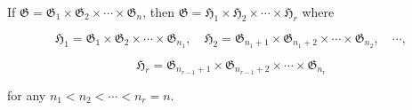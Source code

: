 If $\mathfrak{G} = \mathfrak{G}_1 \times \mathfrak{G}_2 \times \cdots \times \mathfrak{G}_n$, then $\mathfrak{G} = \mathfrak{H}_1 \times \mathfrak{H}_2 \times \cdots \times \mathfrak{H}_r$ where

$$\mathfrak{H}_1 = \mathfrak{G}_1 \times \mathfrak{G}_2 \times \cdots \times \mathfrak{G}_{n_1}, \quad \mathfrak{H}_2 = \mathfrak{G}_{n_1+1} \times \mathfrak{G}_{n_1+2} \times \cdots \times \mathfrak{G}_{n_2}, \quad \cdots,$$

$$\mathfrak{H}_r = \mathfrak{G}_{n_{r-1}+1} \times \mathfrak{G}_{n_{r-1}+2} \times \cdots \times \mathfrak{G}_{n_r}$$

for any $n_1 < n_2 < \cdots < n_r = n$.
